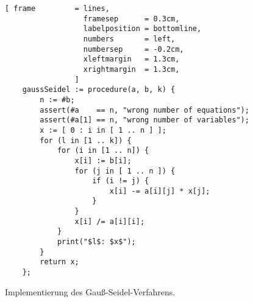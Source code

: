\begin{figure}[!ht]
  \centering
\begin{Verbatim}[ frame         = lines, 
                  framesep      = 0.3cm, 
                  labelposition = bottomline,
                  numbers       = left,
                  numbersep     = -0.2cm,
                  xleftmargin   = 1.3cm,
                  xrightmargin  = 1.3cm,
                ]
    gaussSeidel := procedure(a, b, k) {
        n := #b;
        assert(#a    == n, "wrong number of equations");
        assert(#a[1] == n, "wrong number of variables");
        x := [ 0 : i in [ 1 .. n ] ];
        for (l in [1 .. k]) {
            for (i in [1 .. n]) {
                x[i] := b[i];
                for (j in [ 1 .. n ]) {
                    if (i != j) {
                        x[i] -= a[i][j] * x[j];
                    }
                }
                x[i] /= a[i][i];
            }
            print("$l$: $x$");
        }
        return x;       
    };
    \end{Verbatim}
\vspace*{-0.3cm}
  \caption{Implementierung des Gau{\ss}-Seidel-Verfahrens.}
  \label{fig:seidel.stlx}
\end{figure} %



